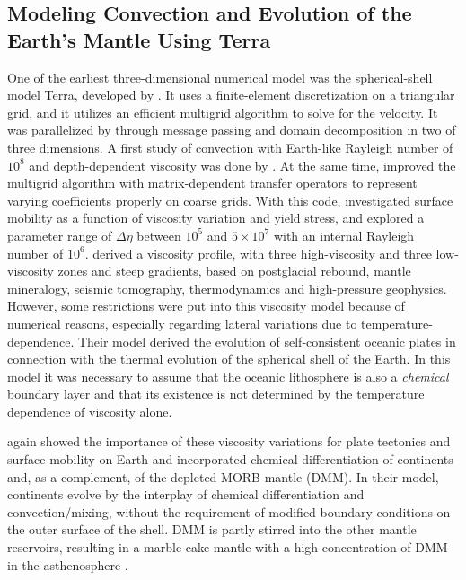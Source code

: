\documentclass[11pt,a4paper,twoside]{article}    %
\begin{document}
\subsection{Modeling Convection and Evolution of the Earth's Mantle Using Terra}

One of the earliest three-dimensional numerical model was the 
spherical-shell model Terra, developed by \citet{Baumgardner1983,Baumgardner1985a}.
It uses a finite-element discretization on a triangular grid, and it utilizes
an efficient multigrid algorithm to solve for the velocity. 
It was parallelized by \citet{Bunge1995} through message passing and
domain decomposition in two of three dimensions. A first study of
convection with Earth-like Rayleigh number of $10^8$ and depth-dependent
viscosity was done by \citet{Bunge1997}. At the same time, \citet{Yang1997}
improved the multigrid algorithm with matrix-dependent transfer operators to
represent varying coefficients properly on coarse grids. With this code,
\citet{Richards2001} investigated surface mobility as a function of viscosity
variation and yield stress, and \citet{Reese2005} explored a parameter range of 
$\Delta \eta$ between $10^5$ and $5 \times 10^7$ with an internal Rayleigh
number of $10^6$. \citet{Walzer2004a} derived a viscosity profile, with three
high-viscosity and three low-viscosity zones and steep gradients, based on 
postglacial rebound, mantle mineralogy, seismic tomography, thermodynamics
and high-pressure geophysics. However, some restrictions were put into this
viscosity model because of numerical reasons, especially regarding lateral
variations due to temperature-dependence. Their model derived the evolution of
self-consistent oceanic plates in connection with the thermal evolution of the
spherical shell of the Earth. In this model it was necessary to assume that the
oceanic lithosphere is also a \emph{chemical} boundary layer and that its
existence is not determined by the temperature dependence of viscosity alone.

\citet{Walzer2008a,Walzer2008b} again showed the importance of these viscosity
variations for plate tectonics and surface mobility on Earth and incorporated
chemical differentiation of continents and, as a complement, of the
depleted MORB mantle (DMM). In their model, continents evolve by the interplay
of chemical differentiation and convection/mixing, without the requirement
of modified boundary conditions on the outer surface of the shell. DMM is partly
stirred into the other mantle reservoirs, resulting in a marble-cake mantle with
a high concentration of DMM in the asthenosphere \citep{Walzer2011}.
\end{document}
